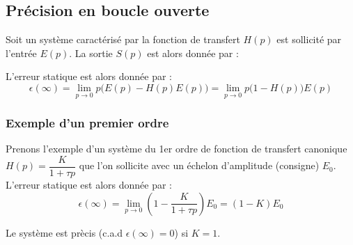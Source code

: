\subsection{Précision en boucle ouverte}

Soit un système caractérisé par la fonction de transfert $H(p)$ 
est sollicité par l'entrée $E(p)$. La sortie $S(p)$ est alors donnée par :

\begin{center}
\end{center}

L'erreur statique est alors donnée par :
$$
\epsilon(\infty)=\lim\limits_{p\to 0} p\big(E(p)-H(p)E(p)\big)=\lim\limits_{p\to 0} p\big(1-H(p)\big)E(p)
$$

\subsubsection{Exemple d'un premier ordre}

Prenons l'exemple d'un système du 1er ordre de fonction de transfert canonique 
$H(p)=\dfrac{K}{1+\tau p}$ que l'on sollicite avec un échelon d'amplitude (consigne) 
$E_0$.
L'erreur statique est alors donnée par :
$$
\epsilon(\infty)=\lim\limits_{p\to 0} \left(1-\dfrac{K}{1+\tau p}\right)E_0=(1-K)E_0
$$

Le système est prècis (c.a.d $\epsilon(\infty)=0$) si $K=1$. 




